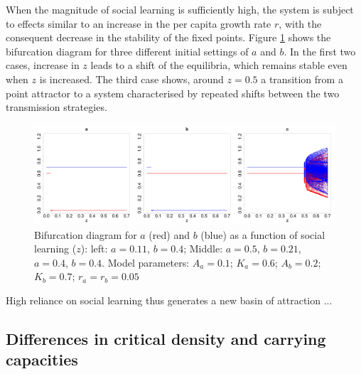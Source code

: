 \documentclass[3p,authoryear,twocolumn]{elsarticle} %
\begin{document}
When the magnitude of social learning is sufficiently high, the system is subject to effects similar to an increase in the per capita growth rate $r$, with the consequent decrease in the stability of the fixed points. Figure \ref{fig:bifurcationWithTransmission} shows the bifurcation diagram for three different initial settings of $a$ and $b$. In the first two cases, increase in $z$ leads to a shift of the equilibria, which remains stable even when $z$ is increased. The third case shows, around $z=0.5$ a transition from a point attractor to a system characterised by repeated shifts between the two transmission strategies. 

\begin{figure}
  \centering
      \includegraphics[width=1\textwidth]{./figures/figure4.jpg}
  \caption{Bifurcation diagram for $a$ (red) and $b$ (blue) as a function of social learning ($z$): left: $a=0.11$, $b=0.4$; Middle: $a=0.5$, $b=0.21$, $a=0.4$, $b=0.4$. Model parameters:  $A_a=0.1$; $K_a=0.6$; $A_b=0.2$; $K_b=0.7$; $r_a=r_b=0.05$}
    \label{fig:bifurcationWithTransmission}
\end{figure}

High reliance on social learning thus generates a new basin of attraction ... %



\subsection{Differences in critical density and carrying capacities}
\end{document}
